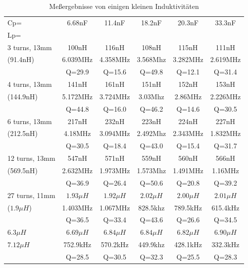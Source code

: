 \begin{table}[H]
\begin{center}
\begin{tabular}{| l | c | c | c | c | c |}
\hline
\hspace{1.5cm} Cp= & 6.68nF    & 11.4nF    & 18.2nF    & 20.3nF    & 33.3nF \\
Lp=           &           &           &           &           &        \\ 
\hline
\hline
3 turns, 13mm & 100nH     & 116nH     & 108nH     & 115nH     & 111nH  \\
 (91.4nH) & 6.039MHz  & 4.358MHz  & 3.568Mhz  & 3.282MHz  & 2.619MHz \\
              & Q=29.9    & Q=15.6    & Q=49.8    & Q=12.1    & Q=31.4  \\
\hline
4 turns, 13mm & 141nH     & 161nH     & 151nH     & 152nH     & 153nH  \\
 (144.9nH)     & 5.172MHz  & 3.724MHz  & 3.03Mhz   & 2.86MHz   & 2.226MHz \\
              & Q=44.8    & Q=16.0    & Q=46.2    & Q=14.6    & Q=30.5  \\
\hline
6 turns, 13mm & 217nH     & 232nH     & 223nH     & 224nH     & 227nH  \\
 (212.5nH)    & 4.18MHz   & 3.094MHz  & 2.492Mhz  & 2.343MHz  & 1.832MHz \\
              & Q=30.5    & Q=18.4    & Q=43.0    & Q=15.4    & Q=31.7  \\
\hline
12 turns, 13mm     & 547nH     & 571nH     & 559nH     & 560nH     & 566nH  \\
 (569.5nH)    & 2.632MHz  & 1.973MHz  & 1.573Mhz  & 1.491MHz  & 1.16MHz \\
              & Q=36.9    & Q=26.4    & Q=50.6    & Q=20.8    & Q=39.2  \\
\hline
27 turns, 11mm & \(1.93\mu H\) & \(1.92\mu H\) & \(2.02\mu H\) & \(2.00\mu H\) & \(2.01\mu H\)  \\
(\(1.9\mu H\)) & 1.403MHz  & 1.067MHz  & 828.5khz  & 789.5kHz  & 615.4kHz \\
              & Q=36.5    & Q=33.4    & Q=43.6    & Q=26.6    & Q=34.5  \\
\hline
\(6.3\mu H\)  & \(6.69\mu H\) & \(6.84\mu H\) & \(6.84\mu H\) & \(6.82\mu H\) & \(6.90\mu H\)  \\
\(7.12\mu H\) & 752.9kHz  & 570.2kHz  & 449.9khz  & 428.1kHz  & 332.3kHz \\
              & Q=28.5    & Q=30.5    & Q=32.3    & Q=25.5    & Q=28.3  \\
\hline
\end{tabular}
\end{center}
\caption{Meßergebnisse von einigen kleinen Induktivitäten}
\label{tab:littleInductors}
\end{table}

